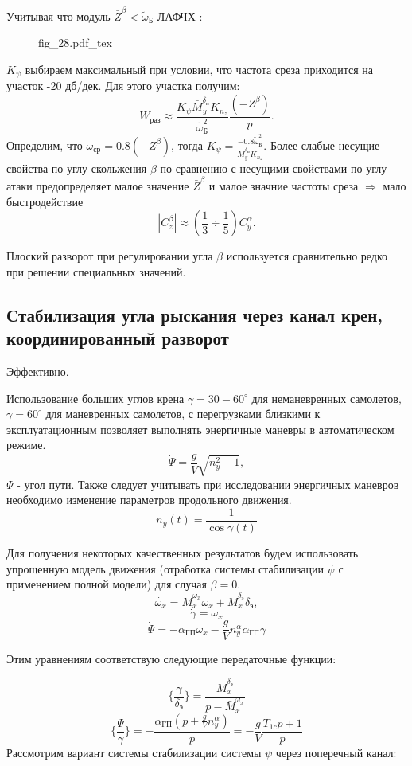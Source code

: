 \documentclass{article}
\begin{document}
Учитывая что модуль $\bar{Z}^\beta < \tilde{\omega}_\text{Б}$
ЛАФЧХ :
\begin{figure}[H]
	\centering
	{fig_28.pdf_tex}
\end{figure}

$K_{\psi}$ выбираем максимальный при условии, что частота среза приходится на участок -20 дб/дек. Для этого участка получим:
\[
	W_\text{раз} \approx \frac{K_{\psi}\bar{M}_y^{\delta_\text{н}} K_{n_z}}{\tilde{\omega}_\text{Б}^2}\frac{(-Z^\beta)}{p}.
\]
Определим, что $\omega_\text{ср} = 0.8(-Z^\beta)$, тогда $K_{\psi}=\frac{-0.8 \tilde{\omega}_\text{Б}^2}{\bar{M}_y^{\delta_\text{н}} K_{n_z}}$.
Более слабые несущие свойства по углу скольжения $\beta$ по сравнению с несущими свойствами по углу атаки предопределяет малое значение $\bar{Z}^\beta$ и малое значние частоты среза $\Rightarrow$ мало быстродействие
\[
	|C_z^\beta| \approx (\frac{1}{3} \div\frac{1}{5}) C_y^\alpha.
\]

Плоский разворот при регулировании угла $\beta$ используется сравнительно редко при решении специальных значений.

\subsection{Стабилизация угла рыскания через канал крен, координированный разворот}
Эффективно.


Использование больших углов крена $\gamma = 30 - 60^\circ$ для неманевренных самолетов, $\gamma = 60^\circ$ для маневренных самолетов, с перегрузками близкими к эксплуатационным позволяет выполнять энергичные маневры в автоматическом режиме.
\[
	\dot{\Psi} =\frac{g}{V} \sqrt{n_y^2 -1},
\]
$\Psi$ - угол пути. Также следует учитывать при исследовании энергичных маневров необходимо изменение параметров продольного движения.
\[
	n_y(t) =\frac{1}{\cos{\gamma(t)}}
\]

Для получения некоторых качественных результатов будем использовать упрощенную модель движения (отработка системы стабилизации $\psi$ с применением полной модели) для случая $\beta = 0$.
\[
	\dot{\omega_x} =\bar{M}_x^{\omega_x} \omega_x +\bar{M}_{x}^{\delta_\text{э}} \delta_\text{э},
\]
\[
	\dot{\gamma} = \omega_x
\]
\[
	\dot{\Psi} = - \alpha_\text{ГП}\omega_x - \frac{g}{V} n_y^\alpha \alpha_\text{ГП}\gamma
\]

Этим уравнениям соответствую следующие передаточные функции:

\[
	\{\frac{\gamma}{\delta_\text{э}} \} =\frac{\bar{M}_{x}^{\delta_\text{э}}}{p -\bar{M}_x^{\omega_x}}
\]
\[
	\{\frac{\Psi}{\gamma}\} = - \frac{\alpha_\text{ГП} (p + \frac{g}{V}n_y^\alpha)}{p} = -\frac{g}{V} \frac{T_{1c}p + 1}{p}
\]
Рассмотрим вариант системы стабилизации системы $\psi$ через поперечный канал:
\end{document}
